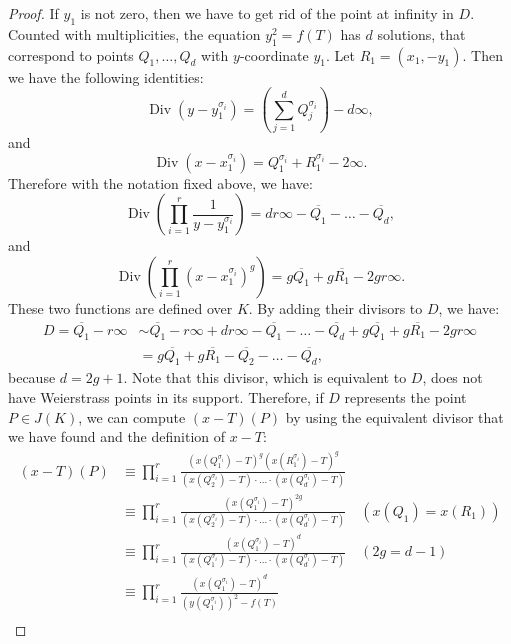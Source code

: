 \documentclass[a4paper, 12pt]{amsart}
\theoremstyle{definition}
\theoremstyle{plain}
\theoremstyle{plain}
\theoremstyle{plain}
\theoremstyle{plain}
\theoremstyle{remark}
\theoremstyle{remark}
\theoremstyle{plain}
\DeclareMathOperator{\Div}{Div}
\begin{document}
\begin{proof}
		If $y_1$ is not zero, then we have to get rid of the point at infinity in $D$. Counted with multiplicities, the equation $y_1^2=f(T)$ has $d$ solutions, that correspond to points $Q_1,\ldots,Q_d$ with $y$-coordinate $y_1$. Let $R_1=(x_1,-y_1)$. Then we have the following identities:
		\begin{equation*}
			\Div(y-y_1^{\sigma_i})=\left(\sum_{j=1}^d Q_j^{\sigma_i}\right)-d\infty,
		\end{equation*}
		and
		\begin{equation*}
			\Div(x-x_1^{\sigma_i})= Q_1^{\sigma_i}+R_1^{\sigma_i}-2\infty.
		\end{equation*}
		Therefore with the notation fixed above, we have:
		\begin{equation*}
				\Div\left(\prod_{i=1}^r \frac{1}{y-y_1^{\sigma_i}}\right)=dr\infty-\overline{Q_1}-\ldots-\overline{Q_d},
		\end{equation*}
		and
		\begin{equation*}
			\Div\left(\prod_{i=1}^r (x-x_1^{\sigma_i})^g\right)=g\overline{Q_1}+g\overline{R_1}-2gr\infty.
		\end{equation*}
		These two functions are defined over $K$. By adding their divisors to $D$, we have:
		\begin{align*}
			D=\overline{Q_1}-r\infty&\sim \overline{Q_1}-r\infty+dr\infty-\overline{Q_1}-\ldots-\overline{Q_d}+g\overline{Q_1}+g\overline{R_1}-2gr\infty\\
			&=g\overline{Q_1}+g\overline{R_1}-\overline{Q_2}-\ldots-\overline{Q_d},
		\end{align*}
		because $d=2g+1$. Note that this divisor, which is equivalent to $D$, does not have Weierstrass points in its support. Therefore, if $D$ represents the point $P\in J(K)$, we can compute $(x-T)(P)$ by using the equivalent divisor that we have found and the definition of $x-T$:
		\begin{align*}
			(x-T)(P)&\equiv \prod_{i=1}^r \frac{(x(Q_1^{\sigma_i})-T)^g(x(R_1^{\sigma_i})-T)^g}{(x(Q_2^{\sigma_i})-T)\cdot\ldots\cdot(x(Q_d^{\sigma_i})-T)}\\
			&\equiv \prod_{i=1}^r \frac{(x(Q_1^{\sigma_i})-T)^{2g}}{(x(Q_2^{\sigma_i})-T)\cdot\ldots\cdot(x(Q_d^{\sigma_i})-T)}\quad (x(Q_1)=x(R_1))\\
			&\equiv \prod_{i=1}^r \frac{(x(Q_1^{\sigma_i})-T)^d}{(x(Q_1^{\sigma_i})-T)\cdot\ldots\cdot(x(Q_d^{\sigma_i})-T)}\quad (2g=d-1)\\
			&\equiv \prod_{i=1}^r \frac{(x(Q_1^{\sigma_i})-T)^d}{(y(Q_1^{\sigma_i}))^2-f(T)}\\

\end{align*}
\end{proof}
\end{document}
